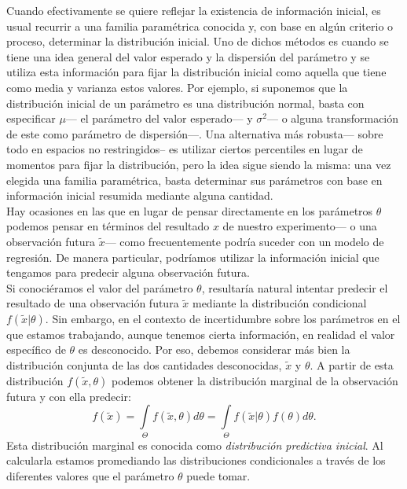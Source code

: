 Cuando efectivamente se quiere reflejar la existencia de información inicial, es usual recurrir a una familia paramétrica conocida y, con base en algún criterio o proceso, determinar la distribución inicial. Uno de dichos métodos es cuando se tiene una idea general del valor esperado y la dispersión del parámetro y se utiliza esta información para fijar la distribución inicial como aquella que tiene como media y varianza estos valores. Por ejemplo, si suponemos que la distribución inicial de un parámetro es una distribución normal, basta con especificar $\mu$--- el parámetro del valor esperado--- y $\sigma^2$--- o alguna transformación de este como parámetro de dispersión---. Una alternativa más robusta--- sobre todo en espacios no restringidos-- es utilizar ciertos percentiles en lugar de momentos para fijar la distribución, pero la idea sigue siendo la misma: una vez elegida una familia paramétrica, basta determinar sus parámetros con base en información inicial resumida mediante alguna cantidad.\\

Hay ocasiones en las que en lugar de pensar directamente en los parámetros $\theta$ podemos pensar en términos del resultado $x$ de nuestro experimento--- o una observación futura $\tilde{x}$--- como frecuentemente podría suceder con un modelo de regresión. De manera particular, podríamos utilizar la información inicial que tengamos para predecir alguna observación futura.\\ 

Si conociéramos el valor del parámetro $\theta$, resultaría natural intentar predecir el resultado de una observación futura $\tilde{x}$ mediante la distribución condicional $f(\tilde{x}|\theta)$. Sin embargo, en el contexto de incertidumbre sobre los parámetros en el que estamos trabajando, aunque tenemos cierta información, en realidad el valor específico de $\theta$ es desconocido. Por eso, debemos considerar más bien la distribución conjunta de las dos cantidades desconocidas, $\tilde{x}$ y $\theta$. A partir de esta distribución $f(\tilde{x},\theta)$ podemos obtener la distribución marginal de la observación futura y con ella predecir: 
\begin{equation*} 
f(\tilde{x})=\int\limits_\Theta f(\tilde{x},\theta)d\theta=\int\limits_\Theta f(\tilde{x}|\theta)f(\theta)d\theta.
\end{equation*}
Esta distribución marginal es conocida como \textit{distribución predictiva inicial}. Al calcularla estamos promediando las distribuciones condicionales a través de los diferentes valores que el parámetro $\theta$ puede tomar.\\


